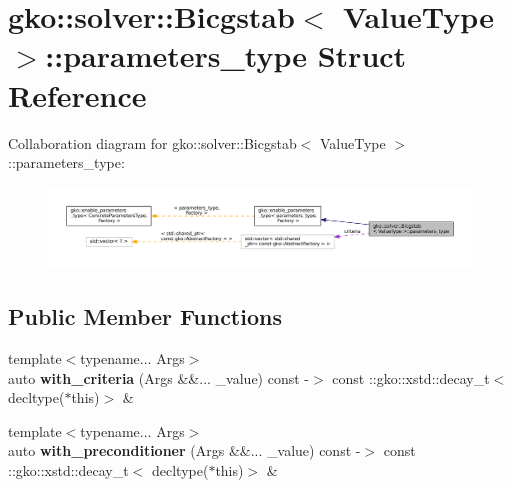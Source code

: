 \hypertarget{structgko_1_1solver_1_1Bicgstab_1_1parameters__type}{}\section{gko\+:\+:solver\+:\+:Bicgstab$<$ Value\+Type $>$\+:\+:parameters\+\_\+type Struct Reference}
\label{structgko_1_1solver_1_1Bicgstab_1_1parameters__type}


Collaboration diagram for gko\+:\+:solver\+:\+:Bicgstab$<$ Value\+Type $>$\+:\+:parameters\+\_\+type\+:
\nopagebreak
\begin{figure}[H]
\begin{center}
\leavevmode
\includegraphics[width=350pt]{structgko_1_1solver_1_1Bicgstab_1_1parameters__type__coll__graph}
\end{center}
\end{figure}
\subsection*{Public Member Functions}
\begin{DoxyCompactItemize}
\item 
\mbox{\label{structgko_1_1solver_1_1Bicgstab_1_1parameters__type_a36dae76d10c91f7932ac294d973ff5de}} 
{\footnotesize template$<$typename... Args$>$ }\\auto {\bfseries with\+\_\+criteria} (Args \&\&... \+\_\+value) const -\/$>$ const \+::gko\+::xstd\+::decay\+\_\+t$<$ decltype($\ast$this)$>$ \&
\item 
\mbox{\label{structgko_1_1solver_1_1Bicgstab_1_1parameters__type_a38f0b0725c7728df90021c217cde23f2}} 
{\footnotesize template$<$typename... Args$>$ }\\auto {\bfseries with\+\_\+preconditioner} (Args \&\&... \+\_\+value) const -\/$>$ const \+::gko\+::xstd\+::decay\+\_\+t$<$ decltype($\ast$this)$>$ \&
\end{DoxyCompactItemize}
